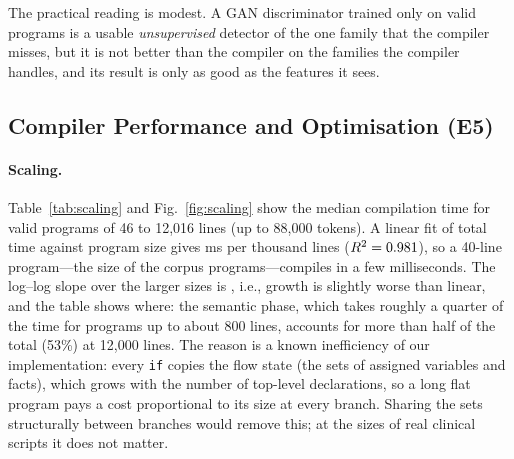 \documentclass[conference]{IEEEtran}
\newcommand{\code}[1]{\texttt{#1}}
\begin{document}
\begin{table}[t]
\centering
\caption{Stability and ablation of the BCE discriminator as anomaly detector (five seeds, mean $\pm$ s.d.).}
\label{tab:anomalycheck}
\footnotesize
{}
\end{table}

The practical reading is modest. A GAN discriminator trained only on valid programs is a usable \emph{unsupervised} detector of the one family that the compiler
misses, but it is not better than the compiler on the families the compiler handles, and its result is only as good as the features it sees.

\subsection{Compiler Performance and Optimisation (E5)}

\paragraph{Scaling.} Table~\ref{tab:scaling} and Fig.~\ref{fig:scaling} show the median compilation time for valid
programs of 46 to 12{,}016 lines (up to 88{,}000 tokens). A linear fit of total time against program size gives
\MsPerKloc{} ms per thousand lines ($R^2=0.981$), so a 40-line program---the size of the corpus programs---compiles in
a few milliseconds. The log--log slope over the larger sizes is \ScaleSlope, i.e., growth is slightly worse than linear, and the
table shows where: the semantic phase, which takes roughly a quarter of the time for programs up to about 800 lines, accounts for more
than half of the total (53\%) at 12{,}000 lines. The reason is a known inefficiency of our implementation: every \code{if} copies the flow state
(the sets of assigned variables and facts), which grows with the number of top-level declarations, so a long flat program
pays a cost proportional to its size at every branch. Sharing the sets structurally between branches would remove this; at
the sizes of real clinical scripts it does not matter.
\end{document}
